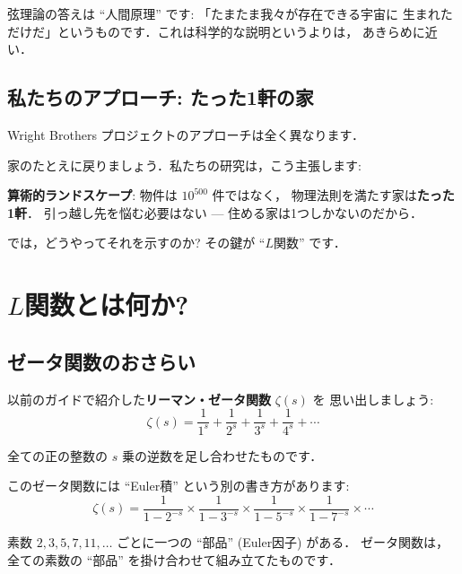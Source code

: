 \documentclass[11pt,a4paper]{article}
\begin{document}
弦理論の答えは ``人間原理'' です: 「たまたま我々が存在できる宇宙に
生まれただけだ」というものです．これは科学的な説明というよりは，
あきらめに近い．

\subsection{私たちのアプローチ: たった1軒の家}

Wright Brothers プロジェクトのアプローチは全く異なります．

家のたとえに戻りましょう．私たちの研究は，こう主張します:

\begin{tcolorbox}[colback=green!5,colframe=green!50!black]
\textbf{算術的ランドスケープ}: 物件は $10^{500}$ 件ではなく，
物理法則を満たす家は\textbf{たった1軒}．
引っ越し先を悩む必要はない --- 住める家は1つしかないのだから．
\end{tcolorbox}

では，どうやってそれを示すのか? その鍵が ``$L$関数'' です．

\section{$L$関数とは何か?}

\subsection{ゼータ関数のおさらい}

以前のガイドで紹介した\textbf{リーマン・ゼータ関数} $\zeta(s)$ を
思い出しましょう:
\begin{equation*}
\zeta(s) = \frac{1}{1^s} + \frac{1}{2^s} + \frac{1}{3^s}
+ \frac{1}{4^s} + \cdots
\end{equation*}

全ての正の整数の $s$ 乗の逆数を足し合わせたものです．

このゼータ関数には ``Euler積'' という別の書き方があります:
\begin{equation*}
\zeta(s) = \frac{1}{1-2^{-s}} \times \frac{1}{1-3^{-s}}
\times \frac{1}{1-5^{-s}} \times \frac{1}{1-7^{-s}} \times \cdots
\end{equation*}

素数 $2, 3, 5, 7, 11, \ldots$ ごとに一つの ``部品'' (Euler因子) がある．
ゼータ関数は，全ての素数の ``部品'' を掛け合わせて組み立てたものです．
\end{document}
